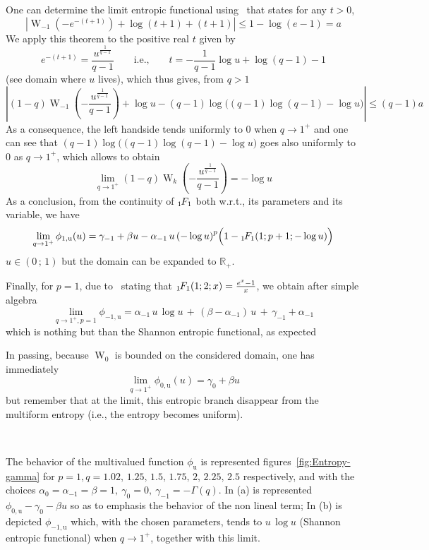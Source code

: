 \documentclass[entropy,article,submit,moreauthors,pdftex]{Definitions/mdpi}
\def\Rset{\mathbb{R}}%
\def\W{\operatorname{W}} %
\newcommand{\hypgeom}[2]{\mbox{}_{#1}\hspace{-1pt}F_{#2}}%
\def\u{\mathrm{u}}
\begin{document}
One can  determine the limit entropic  functional using~\cite[Th.~3.2]{AlzSal18}
that states for any $t > 0$,
%
\[
\left| \W_{-1}\left(  - e^{-(t+1)} \right) +  \log(t+1) + (t+1) \right|  \le 1 -
\log(e-1) = a
\]
%
We apply this theorem to the positive real $t$ given by
%
\[
e^{-(t+1)}  =  \frac{u^{\frac{1}{q-1}}}{q-1}  \qquad  \mbox{i.e.,}  \qquad  t  =
-\frac{1}{q-1} \log u + \log(q-1) - 1
\]
%
(see domain where $u$ lives), which thus gives, from $q > 1$
%
\[
\left| (1-q)  \W_{-1}\left( - \frac{u^{\frac{1}{q-1}}}{q-1}  \right) + \log  u -
(q-1)  \log  \Big( (q-1)  \log(q-1)  -  \log u  \Big)  \right|  \le (q-1) a
\]
%
As a consequence,  the left handside tends  uniformly to 0 when $q  \to 1^+$ and
one can  see that $(q-1) \log  \Big( (q-1) \log(q-1)  - \log u \Big)$  goes also
uniformly to 0 as $q \to 1^+$, which allows to obtain
%
\[
\lim_{q \to  1^+} (1-q) \W_k\left(  - \frac{u^{\frac{1}{q-1}}}{q-1} \right)  = -
\log u
\]
%
As  a conclusion,  from  the  continuity of  $\hypgeom{1}{1}$  both w.r.t.,  its
parameters and its variable, we have
%
\[
\lim_{q \to 1^+}  \phi_{1,\u}(u) = \gamma_{-1} +  \beta u - \alpha_{-1}  \, u \,
\left( - \log u \right)^p \Big(1 - \hypgeom{1}{1}( 1 ; p+1 ; - \log u) \Big)
\]
%
$u \in ( 0 \, ; \, 1)$ but the domain can be expanded to $\Rset_+$.

Finally,   for   $p  =   1$,   due   to~\cite[13.6.14]{AbrSte70}  stating   that
$\hypgeom{1}{1}(1 ; 2 ; x) = \frac{e^x - 1}{x}$, we obtain after simple algebra
%
\[
\lim_{q  \to  1^+,p=1} \phi_{-1,\u}  =  \alpha_{-1}  \, u  \,  \log  u \,  +  \,
(\beta-\alpha_{-1}) \, u \, + \, \gamma_{-1}+\alpha_{-1}
\]
%
which is nothing but than the Shannon entropic functional, as expected

In  passing,  because $\W_0$  is  bounded  on  the  considered domain,  one  has
immediately
%
\[
\lim_{q \to 1^+}  \phi_{0,\u}(u) = \gamma_0 +  \beta u
\]
%
but remember that at the limit, this entropic branch disappear from the multiform
entropy (i.e., the entropy becomes uniform).

\

The   behavior   of   the   multivalued  function   $\phi_\u$   is   represented
figures~\ref{fig:Entropy-gamma} for $p = 1, q =  1.02, \, 1.25, \, 1.5, \, 1.75,
\,  2,  \,  2.25,  \,  2.5$  respectively, and  with  the  choices  $\alpha_0  =
\alpha_{-1} = \beta = 1, \: \gamma_0 =  0, \: \gamma_{-1} = - \Gamma(q)$. In (a)
is represented $\phi_{0,\u} - \gamma_0 - \beta u$ so as to emphasis the behavior
of the non lineal term; In (b) is depicted $\phi_{-1,\u}$ which, with the chosen
parameters, tends  to $u \,  \log u$ (Shannon  entropic functional) when  $q \to
1^+$, together with this limit.
\end{document}
